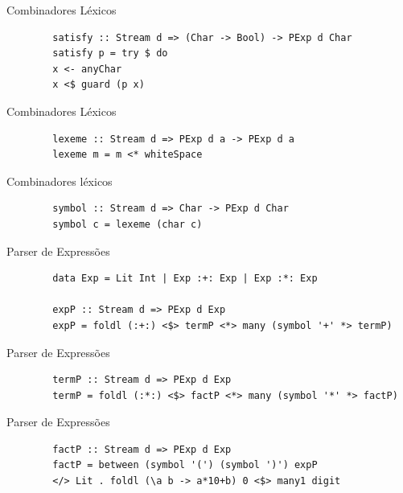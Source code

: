 \begin{frame}[fragile]{Combinadores Léxicos}

    \begin{lstlisting}
        satisfy :: Stream d => (Char -> Bool) -> PExp d Char
        satisfy p = try $ do
        x <- anyChar
        x <$ guard (p x)
    \end{lstlisting}
\end{frame}

\begin{frame}[fragile]{Combinadores Léxicos}

    \begin{lstlisting}
        lexeme :: Stream d => PExp d a -> PExp d a
        lexeme m = m <* whiteSpace
    \end{lstlisting}
\end{frame}

\begin{frame}[fragile]{Combinadores léxicos}

    \begin{lstlisting}
        symbol :: Stream d => Char -> PExp d Char
        symbol c = lexeme (char c)
    \end{lstlisting}
\end{frame}

\begin{frame}[fragile]{Parser de Expressões}

    \begin{lstlisting}
        data Exp = Lit Int | Exp :+: Exp | Exp :*: Exp

        expP :: Stream d => PExp d Exp
        expP = foldl (:+:) <$> termP <*> many (symbol '+' *> termP)
    \end{lstlisting}
\end{frame}

\begin{frame}[fragile]{Parser de Expressões}

    \begin{lstlisting}
        termP :: Stream d => PExp d Exp
        termP = foldl (:*:) <$> factP <*> many (symbol '*' *> factP)
    \end{lstlisting}
\end{frame}

\begin{frame}[fragile]{Parser de Expressões}

    \begin{lstlisting}
        factP :: Stream d => PExp d Exp
        factP = between (symbol '(') (symbol ')') expP
        </> Lit . foldl (\a b -> a*10+b) 0 <$> many1 digit
    \end{lstlisting}
\end{frame}


